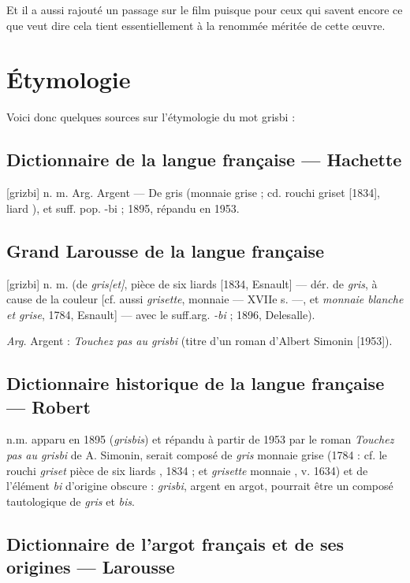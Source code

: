Et il a aussi rajouté un passage sur le film puisque pour ceux qui savent encore
ce que  veut dire cela tient essentiellement à la renommée méritée de cette \oe uvre.


\section{Étymologie\label{preamble-etymology}}


Voici donc quelques sources sur l'étymologie du mot grisbi :


\subsection*{Dictionnaire de la langue française --- Hachette}

[grizbi] n. m. Arg. Argent --- De gris (monnaie grise ; cd. rouchi griset [1834], \og liard \fg{}), et suff. pop. -bi ; 1895, répandu en 1953.


\subsection*{Grand Larousse de la langue française}

[grizbi] n. m. (de \emph{gris[et]}, pièce de six liards [1834, Esnault] --- dér.
de \emph{gris}, à cause de la couleur [cf. aussi \emph{grisette}, \og monnaie \fg{} --- XVIIe s. ---, et \emph{monnaie blanche et grise}, 1784, Esnault] --- avec le suff.arg. \emph{-bi} ; 1896, Delesalle).

\emph{Arg.} Argent : \emph{Touchez pas au grisbi} (titre d'un roman d'Albert
Simonin [1953]).


\subsection*{Dictionnaire historique de la langue française --- Robert}

n.m. apparu en 1895 (\emph{grisbis}) et répandu à partir de 1953 par le roman
\emph{Touchez pas au grisbi} de A. Simonin, serait composé de \emph{gris}
\og monnaie grise \fg{} (1784 : cf. le rouchi \emph{griset} \og pièce de six liards \fg{}, 1834 ; et \emph{grisette} \og monnaie \fg{}, v. 1634) et de l'élément \emph{bi} d'origine obscure : \emph{grisbi}, \og argent \fg{} en argot, pourrait être un composé tautologique de \emph{gris} et \emph{bis}.


\subsection*{Dictionnaire de l'argot français et de ses origines --- Larousse}

